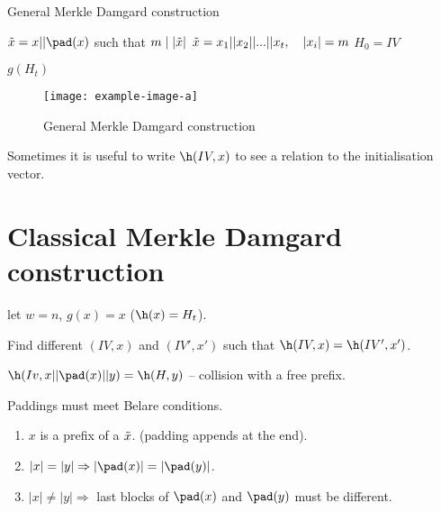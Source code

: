 \begin{algorithm2e}[ht]
    \caption{General Merkle Damgard construction}
    \label{alg:General_Merkle_Damgard_construction}
    

    $\Tilde{x} = x || \pad(x)$ such that $m \mid |\Tilde{x}|$\;
    $\Tilde{x} = x_1 || x_2 || ... || x_t, \quad |x_i| = m$\;
    $H_0 = IV$\;

    \Return $g(H_t)$\;
\end{algorithm2e}

\begin{figure}[ht]
    \centering
    \texttt{[image: example-image-a]}
    \caption{General Merkle Damgard construction}
    \label{fig:General_Merkle_Damgard_construction}
\end{figure}

\begin{remark}
    Sometimes it is useful to write $\h(IV, x)$ to see a relation to the
    initialisation vector.
\end{remark}

\section{Classical Merkle Damgard construction}

let $w = n$, $g(x) = x$ ($\h(x) = H_t$).

\begin{attack}
    Find different $(IV, x)$ and $(IV', x')$ such that $\h(IV, x) = \h(IV', x')$.

    $\h(Iv, x || \pad(x) || y) = \h(H, y)$ -- collision with a free prefix.
\end{attack}

\begin{solution}
    Paddings must meet Belare conditions.
    \begin{enumerate}[noitemsep]
        \item $x$ is a prefix of a $\Tilde{x}$. (padding appends at the end).
        \item $|x| = |y| \Rightarrow |\pad(x)| = |\pad(y)|$.
        \item $|x| \neq |y| \Rightarrow $ last blocks of $\pad(x)$ and $\pad(y)$
            must be different.
    \end{enumerate}
\end{solution}

